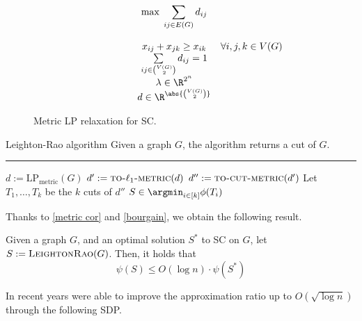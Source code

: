\documentclass[a4paper, 12pt]{report}
\begin{document}
    \begin{figure}[H]
        \centering
        \[\begin{array}{ccl}
            \qquad\qquad\quad
            & \max \; \displaystyle \sum_{ij \in E(G)}{d_{ij}} \\\\
            & x_{ij} + x_{jk} \ge x_{ik} & \forall i, j ,k \in V(G) \\
            & \sum\limits_{ij \in \binom{V(G)}{2}}{d_{ij}} = 1 \\
            & \lambda \in \R^{2^n} \\
            & d \in \R^{\abs{\binom{V(G)}{2}}} \\
        \end{array}\]
        \caption{Metric LP relaxation for SC.}
    \end{figure}

    \begin{framedalgo}{Leighton-Rao algorithm}
        Given a graph $G$, the algorithm returns a cut of $G$. \\
        \hrule

        \quad
        \begin{algorithmic}[1]
                \State $d := \mathrm{LP}_\mathrm{metric}(G)$
                \State $d' := \textsc{to-}\ell_1\textsc{-metric}(d)$ 
                \State $d'' := \textsc{to-cut-metric}(d')$ 
                \State Let $T_1, \ldots, T_k$ be the $k$ cuts of $d''$
                \State {} $\displaystyle S \in \argmin_{i \in [k]}{\phi(T_i)}$
            \EndFunction
        \end{algorithmic}
    \end{framedalgo}
    
    Thanks to \cref{metric cor} and \cref{bourgain}, we obtain the following result.

    \begin{framedthm}{}
        Given a graph $G$, and an optimal solution $S^*$ to SC on $G$, let $S := \textsc{LeightonRao}(G)$. Then, it holds that $$\psi(S) \le O(\log n) \cdot \psi(S^*)$$
    \end{framedthm}
    
    In recent years \textcite{arora} were able to improve the approximation ratio up to $O(\sqrt{\log n})$ through the following SDP.
\end{document}
